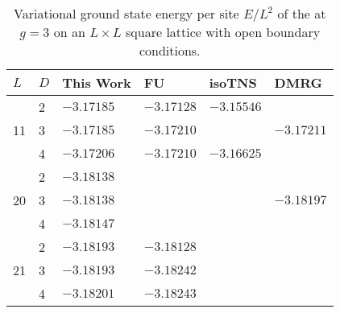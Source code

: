 \begin{table}[htp]
    \centering
    \begin{tabular}{llllll}
        \toprule
        $L$ & $D$ & This Work & FU & isoTNS & DMRG
        \\ \midrule
        \multirow{3}{*}{11} & 2 &
            $-3.17185$ &  %
            $-3.17128$ &  %
            $-3.15546$ &  %
            \multirow{3}{*}{$-3.17211$}  %
        \\
        & 3 &
            $-3.17185$ &  %
            $-3.17210$ &  %
             &  %
        \\
        & 4 &
            $-3.17206$ &  %
            $-3.17210$ &  %
            $-3.16625$ &  %
        \\ \midrule
        \multirow{3}{*}{20} & 2 &
            $-3.18138$ &  %
            &  %
            &  %
            \multirow{3}{*}{$-3.18197$}  %
        \\
        & 3 &
            $-3.18138$ &  %
            &  %
            &  %
        \\
        & 4 &
            $-3.18147$ &  %
            &  %
            &  %
        \\ \midrule
        \multirow{3}{*}{21} & 2 &
            $-3.18193$ &  %
            $-3.18128$ &  %
            &  %
            \multirow{3}{*}{}  %
        \\
        & 3 &
            $-3.18193$ &  %
            $-3.18242$ &  %
            &  %
        \\
        & 4 &
            $-3.18201$ &  %
            $-3.18243$ &  %
            &  %
        \\ \bottomrule
    \end{tabular}
    \caption[
        Variational ground state energies of the TFIM.
    ]{
        \label{tab:gradpeps:gs}
        Variational ground state energy per site $E / L^2$ of the  at $g=3$ on an $L \times L$
        square lattice with open boundary conditions.
}
\end{table}
